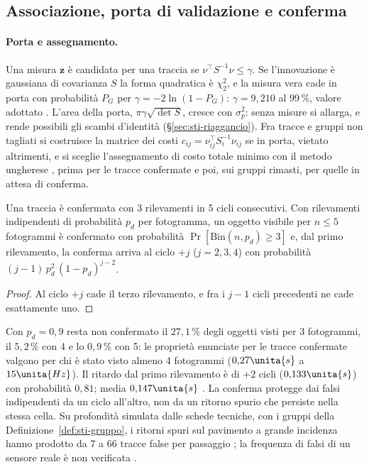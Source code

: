\subsection{Associazione, porta di validazione e conferma}\label{sec:sti-porta}

\paragraph{Porta e assegnamento.} Una misura $\mathbf z$ è candidata per una traccia se $\nu^{\top}S^{-1}\nu\le\gamma$. Se l'innovazione è gaussiana di covarianza $S$ la forma quadratica è $\chi^2_2$, e la misura vera cade in porta con probabilità $P_G$ per $\gamma=-2\ln(1-P_G)$: $\gamma=9{,}210$ al 99\,\%, valore adottato . L'area della porta, $\pi\gamma\sqrt{\det S}$, cresce con $\sigma_p^2$: senza misure si allarga, e rende possibili gli scambi d'identità (\S\ref{sec:sti-riaggancio}). Fra tracce e gruppi non tagliati si costruisce la matrice dei costi $c_{ij}=\nu_{ij}^{\top}S_i^{-1}\nu_{ij}$ se in porta, vietato altrimenti, e si sceglie l'assegnamento di costo totale minimo con il metodo ungherese \cite{kuhn1955}, prima per le tracce confermate e poi, sui gruppi rimasti, per quelle in attesa di conferma.

\begin{proposizione}[Conferma]\label{prop:sti-conferma}
Una traccia è confermata con 3 rilevamenti in 5 cicli consecutivi. Con rilevamenti indipendenti di probabilità $p_d$ per fotogramma, un oggetto visibile per $n\le5$ fotogrammi è confermato con probabilità $\Pr[\mathrm{Bin}(n,p_d)\ge3]$ e, dal primo rilevamento, la conferma arriva al ciclo $+j$ ($j=2,3,4$) con probabilità $(j-1)\,p_d^2\,(1-p_d)^{j-2}$. 
\end{proposizione}
\begin{proof}
Al ciclo $+j$ cade il terzo rilevamento, e fra i $j-1$ cicli precedenti ne cade esattamente uno.
\end{proof}
Con $p_d=0{,}9$ resta non confermato il $27{,}1\,\%$ degli oggetti visti per 3 fotogrammi, il $5{,}2\,\%$ con 4 e lo $0{,}9\,\%$ con 5: le proprietà enunciate per le tracce confermate valgono per chi è stato visto almeno 4 fotogrammi ($0{,}27\unita{s}$ a $15\unita{Hz}$). Il ritardo dal primo rilevamento è di $+2$ cicli ($0{,}133\unita{s}$) con probabilità $0{,}81$; media $0{,}147\unita{s}$ . La conferma protegge dai falsi indipendenti da un ciclo all'altro, non da un ritorno spurio che persiste nella stessa cella. Su profondità simulata dalle schede tecniche, con i gruppi della Definizione~\ref{def:sti-gruppo}, i ritorni spuri sul pavimento a grande incidenza hanno prodotto da 7 a 66 tracce false per passaggio ; la frequenza di falsi di un sensore reale è non verificata .

